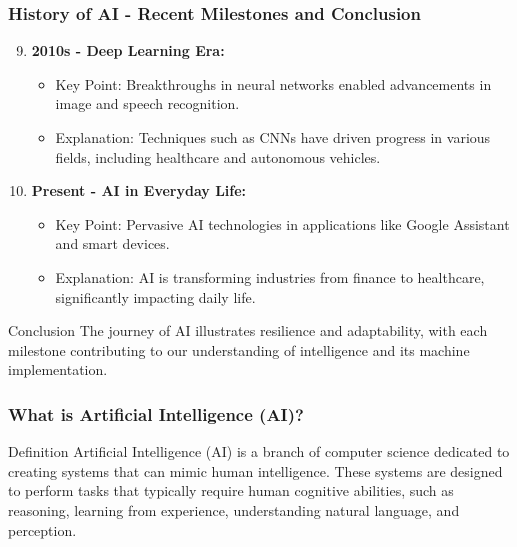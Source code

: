 \documentclass[aspectratio=169]{beamer}
\begin{document}
\begin{frame}[fragile]
    \frametitle{History of AI - Recent Milestones and Conclusion}
    \begin{enumerate}
        \setcounter{enumi}{8} %
        \item {\bf 2010s - Deep Learning Era:}
        \begin{itemize}
            \item Key Point: Breakthroughs in neural networks enabled advancements in image and speech recognition.
            \item Explanation: Techniques such as CNNs have driven progress in various fields, including healthcare and autonomous vehicles.
        \end{itemize}

        \item {\bf Present - AI in Everyday Life:}
        \begin{itemize}
            \item Key Point: Pervasive AI technologies in applications like Google Assistant and smart devices.
            \item Explanation: AI is transforming industries from finance to healthcare, significantly impacting daily life.
        \end{itemize}
    \end{enumerate}
    
    \begin{block}{Conclusion}
        The journey of AI illustrates resilience and adaptability, with each milestone contributing to our understanding of intelligence and its machine implementation.
    \end{block}
\end{frame}

\begin{frame}[fragile]
    \frametitle{What is Artificial Intelligence (AI)?}
    \begin{block}{Definition}
        Artificial Intelligence (AI) is a branch of computer science dedicated to creating systems that can mimic human intelligence. These systems are designed to perform tasks that typically require human cognitive abilities, such as reasoning, learning from experience, understanding natural language, and perception.
    \end{block}
\end{frame}
\end{document}

